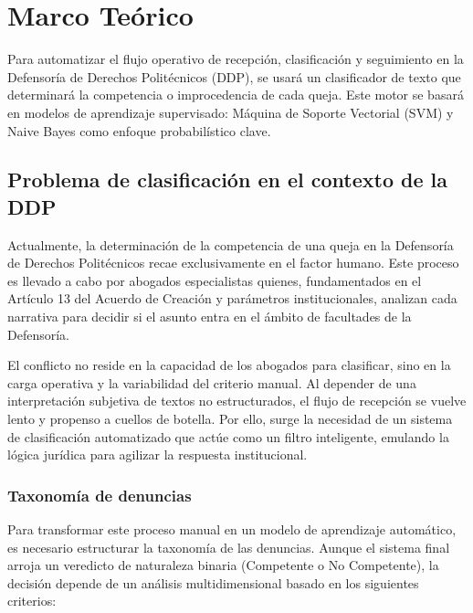 \chapter{Marco Teórico}

Para automatizar el flujo operativo de recepción, clasificación y seguimiento en la Defensoría de Derechos Politécnicos (DDP), se usará un clasificador de texto que determinará la competencia o improcedencia de cada queja. Este motor se basará en modelos de aprendizaje supervisado: Máquina de Soporte Vectorial (SVM) y Naive Bayes como enfoque probabilístico clave.

\section{Problema de clasificación en el contexto de la DDP}

Actualmente, la determinación de la competencia de una queja en la Defensoría de Derechos Politécnicos recae exclusivamente en el factor humano. Este proceso es llevado a cabo por abogados especialistas quienes, fundamentados en el Artículo 13 del Acuerdo de Creación y parámetros institucionales, analizan cada narrativa para decidir si el asunto entra en el ámbito de facultades de la Defensoría.

El conflicto no reside en la capacidad de los abogados para clasificar, sino en la carga operativa y la variabilidad del criterio manual. Al depender de una interpretación subjetiva de textos no estructurados, el flujo de recepción se vuelve lento y propenso a cuellos de botella. Por ello, surge la necesidad de un sistema de clasificación automatizado que actúe como un filtro inteligente, emulando la lógica jurídica para agilizar la respuesta institucional.

\subsection{Taxonomía de denuncias}
Para transformar este proceso manual en un modelo de aprendizaje automático, es necesario estructurar la taxonomía de las denuncias. Aunque el sistema final arroja un veredicto de naturaleza binaria (Competente o No Competente), la decisión depende de un análisis multidimensional basado en los siguientes criterios:

